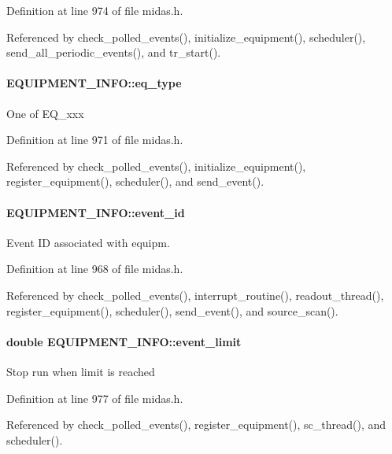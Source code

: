 Definition at line 974 of file midas.h.

Referenced by check\_\-polled\_\-events(), initialize\_\-equipment(), scheduler(), send\_\-all\_\-periodic\_\-events(), and tr\_\-start().
\paragraph[{eq\_\-type}]{ {\bf EQUIPMENT\_\-INFO::eq\_\-type}}\hfill\label{structEQUIPMENT__INFO_a5d2b5c1a08c8312e86963499122d3c06}
One of EQ\_\-xxx 

Definition at line 971 of file midas.h.

Referenced by check\_\-polled\_\-events(), initialize\_\-equipment(), register\_\-equipment(), scheduler(), and send\_\-event().
\paragraph[{event\_\-id}]{ {\bf EQUIPMENT\_\-INFO::event\_\-id}}\hfill\label{structEQUIPMENT__INFO_a83d6e0d3f9bb5990400d40e84a2be378}
Event ID associated with equipm. 

Definition at line 968 of file midas.h.

Referenced by check\_\-polled\_\-events(), interrupt\_\-routine(), readout\_\-thread(), register\_\-equipment(), scheduler(), send\_\-event(), and source\_\-scan().
\paragraph[{event\_\-limit}]{\setlength{\rightskip}{0pt plus 5cm}double {\bf EQUIPMENT\_\-INFO::event\_\-limit}}\hfill\label{structEQUIPMENT__INFO_a4f67b0a6bdc9fd382ea981f6a9dfdfcf}
Stop run when limit is reached 

Definition at line 977 of file midas.h.

Referenced by check\_\-polled\_\-events(), register\_\-equipment(), sc\_\-thread(), and scheduler().
